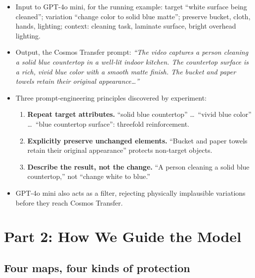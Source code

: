 \begin{itemize}
    \item Input to GPT-4o mini, for the running example: target ``white surface being cleaned''; variation ``change color to solid blue matte''; preserve bucket, cloth, hands, lighting; context: cleaning task, laminate surface, bright overhead lighting.
    \item Output, the Cosmos Transfer prompt: \emph{``The video captures a person cleaning a solid blue countertop in a well-lit indoor kitchen. The countertop surface is a rich, vivid blue color with a smooth matte finish. The bucket and paper towels retain their original appearance\ldots''}
    \item Three prompt-engineering principles discovered by experiment:
    \begin{enumerate}
        \item \textbf{Repeat target attributes.} ``solid blue countertop'' \ldots\ ``vivid blue color'' \ldots\ ``blue countertop surface'': threefold reinforcement.
        \item \textbf{Explicitly preserve unchanged elements.} ``Bucket and paper towels retain their original appearance'' protects non-target objects.
        \item \textbf{Describe the result, not the change.} ``A person cleaning a solid blue countertop,'' not ``change white to blue.''
    \end{enumerate}
    \item GPT-4o mini also acts as a filter, rejecting physically implausible variations before they reach Cosmos Transfer.
\end{itemize}

\section{Part 2: How We Guide the Model}
\label{sec:part2}

\subsection{Four maps, four kinds of protection}

